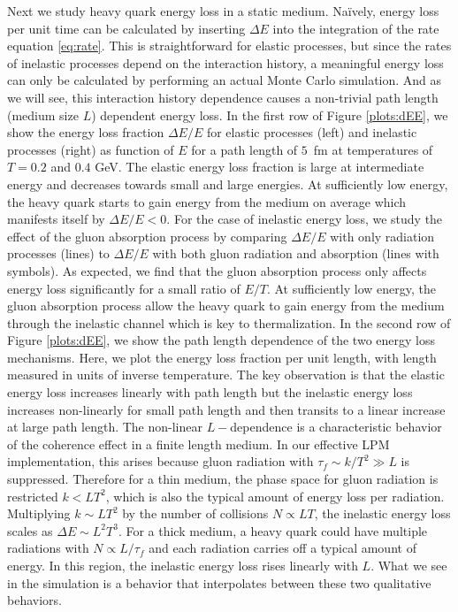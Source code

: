\documentclass[aps, prc, reprint, amsmath, groupedaddress, nofootinbib]{revtex4-1}
\begin{document}
Next we study heavy quark energy loss in a static medium.
Na\"ively, energy loss per unit time can be calculated by inserting $\Delta E$ into the integration of the rate equation \ref{eq:rate}. 
This is straightforward for elastic processes, but since the rates of inelastic processes depend on the interaction history, a meaningful energy loss can only be calculated by performing an actual Monte Carlo simulation.
And as we will see, this interaction history dependence causes a non-trivial path length (medium size $L$) dependent energy loss.
In the first row of Figure \ref{plots:dEE}, we show the energy loss fraction $\Delta E/E$ for elastic processes (left) and inelastic processes (right) as function of $E$ for a path length of $5$~fm at temperatures of $T=0.2$ and $0.4$  GeV.
The elastic energy loss fraction is large at intermediate energy and decreases towards small and large energies.
At sufficiently low energy, the heavy quark starts to gain energy from the medium on average which  manifests itself by $\Delta E/E < 0$.
For the case of inelastic energy loss, we study the effect of the gluon absorption process by comparing $\Delta E/E$ with only radiation processes (lines) to $\Delta E/E$ with both gluon radiation and absorption (lines with symbols).
As expected, we find that the gluon absorption process only affects energy loss significantly for a small ratio of $E/T$.
At sufficiently low energy, the gluon absorption process allow the heavy quark to gain energy from the medium through the inelastic channel which is key to thermalization.
In the second row of Figure \ref{plots:dEE}, we show the path length dependence of the two energy loss mechanisms.
Here, we plot the energy loss fraction per unit length, with length measured in units of inverse temperature.
The key observation is that the elastic energy loss increases linearly with path length but the inelastic energy loss increases non-linearly for small path length and then transits to a linear increase at large path length. 
The non-linear $L-$dependence is a characteristic behavior of the coherence effect in a finite length medium. 
In our effective LPM implementation, this arises because gluon radiation with $\tau_f \sim k/T^2 \gg L$ is suppressed.
Therefore for a thin medium, the phase space for gluon radiation is restricted $k < LT^2$, which is also the typical amount of energy loss per radiation.
Multiplying $k \sim LT^2$ by the number of collisions $N \propto LT$, the inelastic energy loss scales as $\Delta E \sim L^2T^3$.
For a thick medium, a heavy quark could have multiple radiations with $N \propto L/\tau_f$ and each radiation carries off a typical amount of energy. 
In this region, the inelastic energy loss rises linearly with $L$.
What we see in the simulation is a behavior that interpolates between these two qualitative behaviors.
\end{document}
